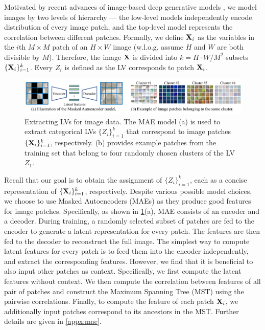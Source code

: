 \documentclass{article} %
\begin{document}
Motivated by recent advances of image-based deep generative models \citep{dosovitskiy2020image,liu2021swin}, we model images by two levels of hierarchy --- the low-level models independently encode distribution of every image patch, and the top-level model represents the correlation between different patches. Formally, we define $\mathbf{X}_i$ as the variables in the $i$th $M \times M$ patch of an $H \times W$ image (w.l.o.g. assume $H$ and $W$ are both divisible by $M$). Therefore, the image $\mathbf{X}$ is divided into $k = H \cdot W / M^2$ subsets $\{\mathbf{X}_i\}_{i=1}^{k}$. Every $Z_i$ is defined as the LV corresponds to patch $\mathbf{X}_i$.

\begin{figure}
    \centering
    \includegraphics[width=\columnwidth]{figures/fig-mae.pdf}
    \vspace{-2.0em}
    \caption{Extracting LVs for image data. The MAE model (a) is used to extract categorical LVs $\{Z_i\}_{i=1}^{k}$ that correspond to image patches $\{\mathbf{X}_i\}_{i=1}^{k}$, respectively. (b) provides example patches from the training set that belong to four randomly chosen clusters of the LV $Z_1$.}
    \label{fig:mae}
\end{figure}

Recall that our goal is to obtain the assignment of $\{Z_i\}_{i=1}^{k}$, each as a concise representation of $\{\mathbf{X}_i\}_{i=1}^{k}$, respectively. Despite various possible model choices, we choose to use Masked Autoencoders (MAEs) \citep{he2022masked} as they produce good features for image patches. Specifically, as shown in \cref{fig:mae}(a), MAE consists of an encoder and a decoder. During training, a randomly selected subset of patches are fed to the encoder to generate a latent representation for every patch. The features are then fed to the decoder to reconstruct the full image. The simplest way to compute latent features for every patch is to feed them into the encoder independently, and extract the corresponding features. However, we find that it is beneficial to also input other patches as context. Specifically, we first compute the latent features without context. We then compute the correlation between features of all pair of patches and construct the Maximum Spanning Tree (MST) using the pairwise correlations. Finally, to compute the feature of each patch $\mathbf{X}_i$, we additionally input patches correspond to its ancestors in the MST. Further details are given in \cref{appx:mae}.
\end{document}
